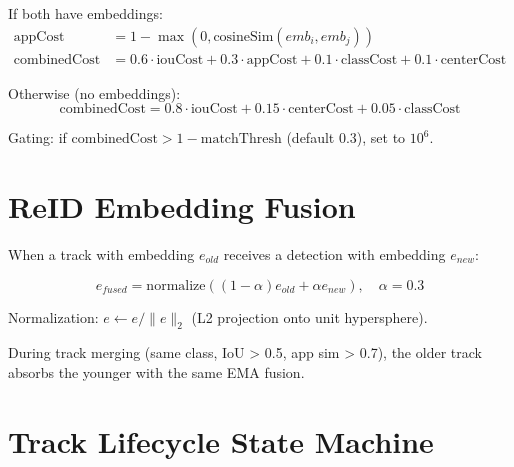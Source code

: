 If both have embeddings:
\begin{align}
\text{appCost} &= 1 - \max(0, \text{cosineSim}(emb_i, emb_j)) \\
\text{combinedCost} &= 0.6 \cdot \text{iouCost} + 0.3 \cdot \text{appCost} + 0.1 \cdot \text{classCost} + 0.1 \cdot \text{centerCost}
\end{align}

Otherwise (no embeddings):
\[
\text{combinedCost} = 0.8 \cdot \text{iouCost} + 0.15 \cdot \text{centerCost} + 0.05 \cdot \text{classCost}
\]

Gating: if $\text{combinedCost} > 1 - \text{matchThresh}$ (default 0.3), set to $10^6$.

\section{ReID Embedding Fusion}
\label{sec:reid-fusion}

When a track with embedding $e_{old}$ receives a detection with embedding $e_{new}$:

\[
e_{fused} = \text{normalize}((1-\alpha) e_{old} + \alpha e_{new}), \quad \alpha = 0.3
\]

Normalization: $e \leftarrow e / \|e\|_2$ (L2 projection onto unit hypersphere).

During track merging (same class, IoU > 0.5, app sim > 0.7), the older track absorbs the younger with the same EMA fusion.

\section{Track Lifecycle State Machine}
\label{sec:lifecycle-alg}

\begin{center}
\end{center}

